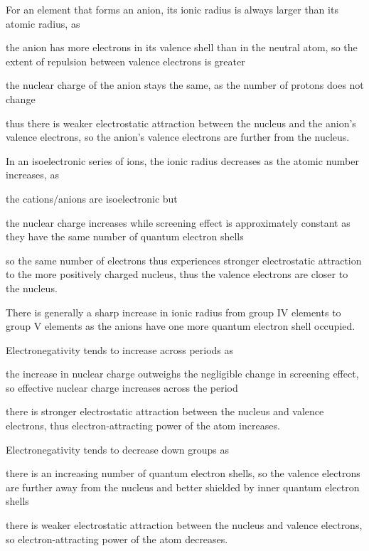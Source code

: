 \documentclass[Chemistry.tex]{subfiles}
\begin{document}
For an element that forms an anion, its ionic radius is always larger than its atomic radius, as \begin{slinenum}
\item the anion has more electrons in its valence shell than in the neutral atom, so the extent of repulsion between valence electrons is greater
\item the nuclear charge of the anion stays the same, as the number of protons does not change
\item thus there is weaker electrostatic attraction between the nucleus and the anion's valence electrons, so the anion's valence electrons are further from the nucleus.
\end{slinenum}

In an isoelectronic series of ions, the ionic radius decreases as the atomic number increases, as \begin{slinenum}
\item the cations\slash anions are isoelectronic but
\item the nuclear charge increases while screening effect is approximately constant as they have the same number of quantum electron shells
\item so the same number of electrons thus experiences stronger electrostatic attraction to the more positively charged nucleus, thus the valence electrons are closer to the nucleus.
\end{slinenum} There is generally a sharp increase in ionic radius from group IV elements to group V elements as the anions have one more quantum electron shell occupied.

Electronegativity tends to increase across periods as \begin{slinenum}
\item the increase in nuclear charge outweighs the negligible change in screening effect, so effective nuclear charge increases across the period
\item there is stronger electrostatic attraction between the nucleus and valence electrons, thus electron-attracting power of the atom increases.
\end{slinenum}

Electronegativity tends to decrease down groups as \begin{slinenum}
\item there is an increasing number of quantum electron shells, so the valence electrons are further away from the nucleus and better shielded by inner quantum electron shells
\item there is weaker electrostatic attraction between the nucleus and valence electrons, so electron-attracting power of the atom decreases.
\end{slinenum}
\end{document}
